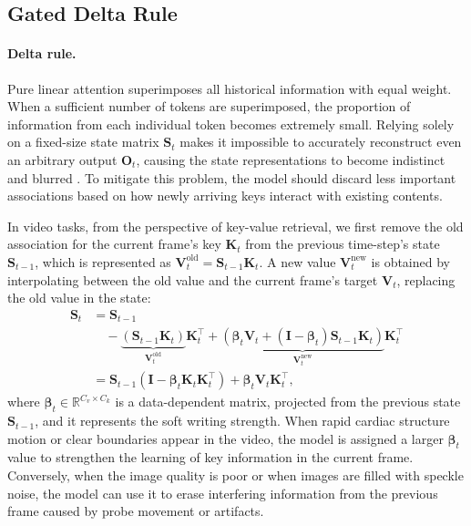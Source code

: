 \subsection{Gated Delta Rule}
    \label{subsec:gated_delta_rule}
\paragraph{Delta rule.}
Pure linear attention superimposes all historical information with equal weight. When a sufficient number of tokens are superimposed, the proportion of information from each individual token becomes extremely small. Relying solely on a fixed-size state matrix $\mathbf{S}_{t}$ makes it impossible to accurately reconstruct even an arbitrary output $\boldsymbol{O}_{t}$, causing the state representations to become indistinct and blurred \cite{yang2024parallelizing,schlag_linear_2021,sun_retentive_2023}. 
To mitigate this problem, the model should discard less important associations based on how newly arriving keys interact with existing contents.

In video tasks, from the perspective of key-value retrieval, we first remove the old association for the current frame's key $\boldsymbol{K}_t$ from the previous time-step’s state $\mathbf{S}_{t-1}$, which is represented as $\boldsymbol{V}_{t}^{\text{old}}= \mathbf{S}_{t-1} \boldsymbol{K}_t$. A new value $\boldsymbol{V}_{t}^{\text{new}}$ is obtained by interpolating between the old value and the current frame’s target $\boldsymbol{V}_{t}$, replacing the old value in the state: 
\begin{equation}
	\begin{aligned}
		\mathbf{S}_{t}  &= \mathbf{S}_{t-1} \\
							&\quad  - \underbrace{ \left( \mathbf{S}_{t-1} \boldsymbol{K}_t \right) }_{\boldsymbol{V}_t^{\text{old}}} \boldsymbol{K}_t^{\intercal} 
									+ \underbrace{ \left( \boldsymbol{\beta}_t \boldsymbol{V}_t + \left( \mathbf{I} - \boldsymbol{\beta}_t \right) \mathbf{S}_{t-1} \boldsymbol{K}_t \right)}_{\boldsymbol{V}_t^{\text{new}}} \boldsymbol{K}_t^{\intercal} \\
						&= \mathbf{S}_{t-1} \left( \mathbf{I} - \boldsymbol{\beta}_t \boldsymbol{K}_t \boldsymbol{K}_t^{\intercal} \right)  + \boldsymbol{\beta}_t  \boldsymbol{V}_t \boldsymbol{K}_t^{\intercal},
	\end{aligned}
	\label{eq:delta_rule}
\end{equation}
where $\boldsymbol{\beta}_t \in \mathbb{R}^{C_v \times C_k}$ is a data-dependent matrix, projected from the previous state $\mathbf{S}_{t-1}$, and it represents the soft writing strength. 
When rapid cardiac structure motion or clear boundaries appear in the video, the model is assigned a larger $\boldsymbol{\beta}_t$ value to strengthen the learning of key information in the current frame. Conversely, when the image quality is poor or when images are filled with speckle noise, the model can use it to erase interfering information from the previous frame caused by probe movement or artifacts.
%
